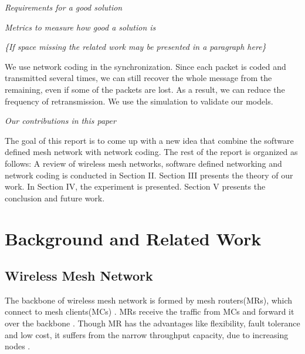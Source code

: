 \documentclass[10pt,conference,final]{IEEEtran}
\newcommand{\Hide}[1]{%
	{ 
		\parindent0pt
		\emph{\scriptsize #1}
	}
}
\begin{document}
	\Hide{Requirements for a good solution}
	\Hide{Metrics to measure how good a solution is}
	
	
	
	\Hide{\{If space missing the related work may be presented in a paragraph here\}}
	
	
	
	
	We use network coding in the synchronization. Since each packet is coded and transmitted several times, we can still recover the whole message from the remaining, even if some of the packets are lost. As a result, we can reduce the frequency of retransmission. We use the simulation to validate our models.
	
	\Hide{Our contributions in this paper}
	
	
	The goal of this report is to come up with a new idea that combine the software defined mesh network with network coding. The rest of the report is organized as follows: A review of wireless mesh networks, software defined networking and network coding is conducted in Section II. Section III presents the theory of our work. In Section IV, the experiment is presented. Section V presents the conclusion and future work.
	
	\section{Background and Related Work}
	\label{sec:background}
	
	\subsection{Wireless Mesh Network}
	
	The backbone of wireless mesh network is formed by mesh routers(MRs), which connect to mesh clients(MCs) \cite{akyildiz2005wireless}. MRs receive the traffic from MCs and forward it over the backbone \cite{chowdhury2008cognitive}. Though MR has the advantages like flexibility, fault tolerance and low cost, it suffers from the narrow throughput capacity, due to increasing nodes \cite{gupta2000capacity}.
	
\end{document}
